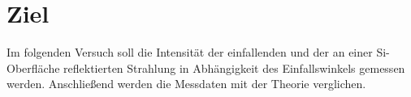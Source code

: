 \section{Ziel}
\label{sec:Ziel}

Im folgenden Versuch soll die Intensität der einfallenden und
der an einer Si-Oberfläche reflektierten Strahlung in Abhängigkeit des Einfallswinkels gemessen werden. 
Anschließend werden die Messdaten mit der Theorie verglichen.